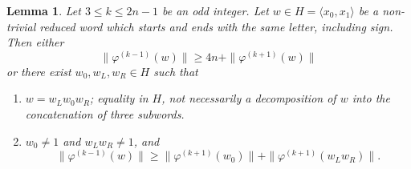 \documentclass[12pt,reqno,a4paper]{article}
\newtheorem{lemma}[theorem]{Lemma}
\theoremstyle{definition}
\theoremstyle{remark}
\numberwithin{equation}{section}
\numberwithin{figure}{section}
\newcommand{\AL}[1]{\textcolor{red}{#1}}
\begin{document}
\begin{lemma}\label{L:intricate}
Let $3\leq k\leq 2n-1$ be an odd integer. Let $w\in H=\langle x_0,x_1\rangle$ be a non-trivial
reduced word which starts and ends with the same letter, including sign.
Then either
$$
\|\varphi^{(k-1)}(w)\|\geq 4n + \|\varphi^{(k+1)}(w)\|
$$
or there exist $w_0,w_L,w_R\in H$ such that 
\begin{enumerate}[label=(\alph*)]
\item $w=w_Lw_0w_R$; equality in $H$, not necessarily a decomposition of $w$ into the concatenation of three subwords. %

\item $w_0\neq 1$ and $w_Lw_R\neq 1$, and 
$$
\|\varphi^{(k-1)}(w)\|\geq  \|\varphi^{(k+1)}(w_0)\|+ \|\varphi^{(k+1)}(w_Lw_R)\|.
$$
\end{enumerate}
\end{lemma}
\end{document}
